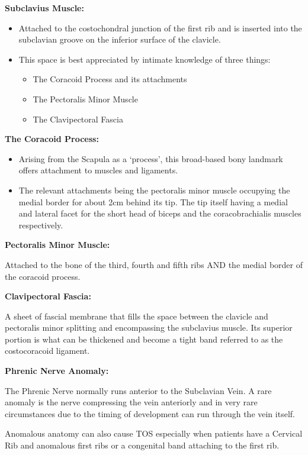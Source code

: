 \documentclass[
]{book}
\begin{document}
\textbf{Subclavius Muscle:}

\begin{itemize}
\item
  Attached to the costochondral junction of the first rib and is
  inserted into the subclavian groove on the inferior surface of the
  clavicle. \citep{mcminnLastAnatomyRegional2019}
\item
  This space is best appreciated by intimate knowledge of three
  things:

  \begin{itemize}
  \item
    The Coracoid Process and its attachments
  \item
    The Pectoralis Minor Muscle
  \item
    The Clavipectoral Fascia
  \end{itemize}
\end{itemize}

\textbf{The Coracoid Process:}

\begin{itemize}
\item
  Arising from the Scapula as a `process', this broad-based bony
  landmark offers attachment to muscles and ligaments.
\item
  The relevant attachments being the pectoralis minor muscle occupying
  the medial border for about 2cm behind its tip. The tip itself
  having a medial and lateral facet for the short head of biceps and
  the coracobrachialis muscles respectively.
\end{itemize}

\textbf{Pectoralis Minor Muscle:}

Attached to the bone of the third, fourth and fifth ribs AND the medial
border of the coracoid process.

\textbf{Clavipectoral Fascia:}

A sheet of fascial membrane that fills the space between the clavicle
and pectoralis minor splitting and encompassing the subclavius muscle.
Its superior portion is what can be thickened and become a tight band
referred to as the costocoracoid ligament.

\textbf{Phrenic Nerve Anomaly:}

The Phrenic Nerve normally runs anterior to the Subclavian Vein. A rare
anomaly is the nerve compressing the vein anteriorly and in very rare
circumstances due to the timing of development can run through the vein
itself.

Anomalous anatomy can also cause TOS especially when patients have a
Cervical Rib and anomalous first ribs or a congenital band attaching to
the first rib.
\end{document}
